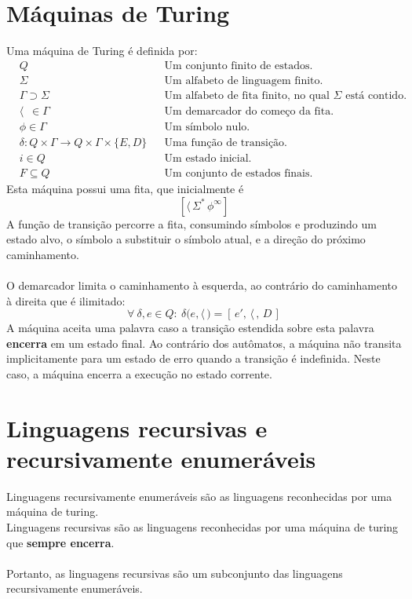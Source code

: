 \documentclass[11pt]{article}
\begin{document}
\section{Máquinas de Turing}
\label{sec:org5f071e5}
Uma máquina de Turing é definida por:
\begin{align*}
  & Q && \text{Um conjunto finito de estados.} \\
  & \Sigma && \text{Um alfabeto de linguagem finito.} \\
  & \Gamma \supset \Sigma && \text{Um alfabeto de fita finito, no qual $\Sigma$ está contido.} \\
  & \langle \enspace \in \Gamma && \text{Um demarcador do começo da fita.} \\
  & \phi \in \Gamma && \text{Um símbolo nulo.} \\
  & \delta: Q \times \Gamma \to Q \times \Gamma \times \{E, D\} && \text{Uma função de transição.} \\
  & i \in Q && \text{Um estado inicial.} \\
  & F \subseteq Q && \text{Um conjunto de estados finais.}
\end{align*}
Esta máquina possui uma fita, que inicialmente é
\[
  \left[\langle\,\Sigma^*\,\phi^\infty\right]
\]
A função de transição percorre a fita, consumindo símbolos e produzindo um estado alvo,
o símbolo a substituir o símbolo atual, e a direção do próximo
caminhamento. \\ \\
O demarcador limita o caminhamento à esquerda, ao contrário do caminhamento à direita
que é ilimitado:
\[
  \forall\> \delta, e \in Q: \>\delta\big(e, \langle\,\big) = \left[\,e',\, \langle\,,\, D\,\right]
\]
A máquina aceita uma palavra caso a transição estendida sobre esta palavra \textbf{encerra} em um
estado final. Ao contrário dos autômatos, a máquina não transita implicitamente para um
estado de erro quando a transição é indefinida. Neste caso, a máquina encerra a
execução no estado corrente.
\section{Linguagens recursivas e recursivamente enumeráveis}
\label{sec:orge234436}
Linguagens recursivamente enumeráveis são as linguagens reconhecidas por uma máquina de
turing. \\
Linguagens recursivas são as linguagens reconhecidas por uma máquina de turing que
\textbf{sempre encerra}. \\ \\
Portanto, as linguagens recursivas são um subconjunto das linguagens recursivamente
enumeráveis.
\end{document}
